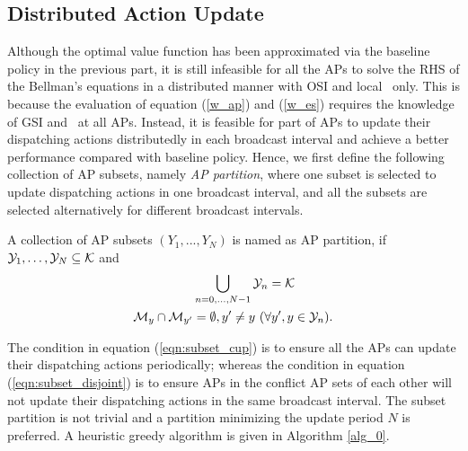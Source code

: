 \subsection{Distributed Action Update}
\label{subsec:ap_alg}
Although the optimal value function has been approximated via the baseline policy in the previous part, it is still infeasible for all the APs to solve the RHS of the Bellman's equations in a distributed manner with OSI and local \brlatency~only.
This is because the evaluation of equation (\ref{w_ap}) and (\ref{w_es}) requires the knowledge of GSI and \brlatency~at all APs.
Instead, it is feasible for part of APs to update their dispatching actions distributedly in each broadcast interval and achieve a better performance compared with baseline policy.
Hence, we first define the following collection of AP subsets, namely \emph{AP partition}, where one subset is selected to update dispatching actions in one broadcast interval, and all the subsets are selected alternatively for different broadcast {intervals}.
\begin{definition}[AP Partition]
    A collection of AP subsets $(Y_1, ..., Y_N)$ is named as AP partition, if $\mathcal{Y}_{1}, \dots, \mathcal{Y}_{N} \subseteq \mathcal{K}$ and
    \begin{align}
        &\bigcup_{n=0,\dots,N-1} \mathcal{Y}_{n} = \mathcal{K}
        \label{eqn:subset_cup}
        \\
        \mathcal{M}_{y} \cap \mathcal{M}_{y'} &=\emptyset, y' \neq y~(\forall y',y \in \mathcal{Y}_{n}).
        \label{eqn:subset_disjoint}
    \end{align}
\end{definition}
The condition in equation (\ref{eqn:subset_cup}) is to ensure all the APs can update their dispatching actions periodically; whereas the condition in equation (\ref{eqn:subset_disjoint}) is to ensure APs in the conflict AP sets of each other will not update their dispatching actions in the same broadcast interval.
The subset partition is not trivial and a partition minimizing the update period $N$ is preferred.
A heuristic greedy algorithm is given in Algorithm \ref{alg_0}.
